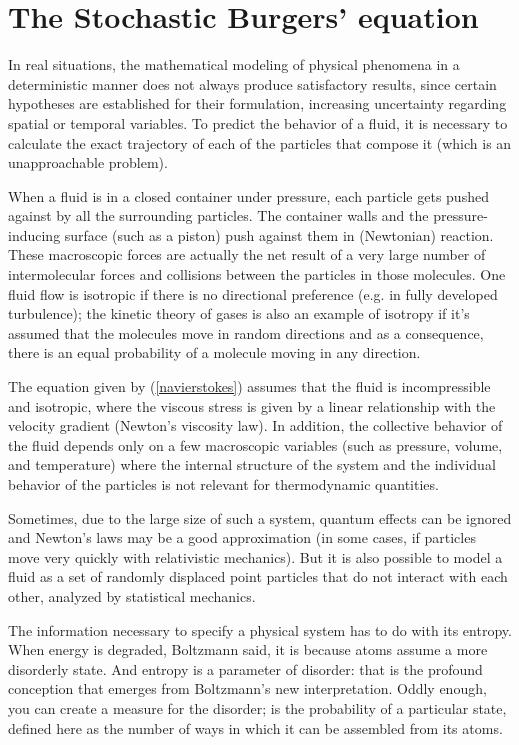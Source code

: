 \section{The Stochastic Burgers' equation}
     
    In real situations, the mathematical modeling of physical phenomena in a deterministic manner does not always produce satisfactory results, since certain hypotheses are established for their formulation, increasing uncertainty regarding spatial or temporal variables. To predict the behavior of a fluid, it is necessary to calculate the exact trajectory of each of the particles that compose it (which is an unapproachable problem). 
    
    When a fluid is in a closed container under pressure, each particle gets pushed against by all the surrounding particles. The container walls and the pressure-inducing surface (such as a piston) push against them in (Newtonian) reaction. These macroscopic forces are actually the net result of a very large number of intermolecular forces and collisions between the particles in those molecules. One fluid flow is isotropic if there is no directional preference (e.g. in fully developed turbulence); the kinetic theory of gases is also an example of isotropy if it's assumed that the molecules move in random directions and as a consequence, there is an equal probability of a molecule moving in any direction. 
    
    The equation given by (\ref{navierstokes}) assumes that the fluid is incompressible and isotropic, where the viscous stress is given by a linear relationship with the velocity gradient (Newton's viscosity law). In addition, the collective behavior of the fluid depends only on a few macroscopic variables (such as pressure, volume, and temperature) where the internal structure of the system and the individual behavior of the particles is not relevant for thermodynamic quantities. 
    
    Sometimes, due to the large size of such a system, quantum effects can be ignored and Newton's laws may be a good approximation (in some cases, if particles move very quickly with relativistic mechanics). But it is also possible to model a fluid as a set of randomly displaced point particles that do not interact with each other, analyzed by statistical mechanics.
    
    The information necessary to specify a physical system has to do with its entropy. When energy is degraded, Boltzmann said, it is because atoms assume a more disorderly state. And entropy is a parameter of disorder: that is the profound conception that emerges from Boltzmann's new interpretation. Oddly enough, you can create a measure for the disorder; is the probability of a particular state, defined here as the number of ways in which it can be assembled from its atoms. 
    
